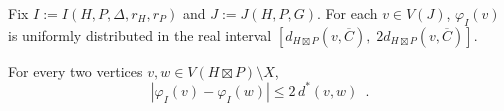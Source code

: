 \documentclass{patmorin}
\renewcommand{\ge}{\geqslant}
\renewcommand{\le}{\leqslant}
\begin{document}


\begin{obs}\label{uniform}
  Fix $I:=I(H,P,\Delta,r_H,r_P)$ and $J:=J(H,P,G)$.  For each $v\in V(J)$,
  $\varphi_I(v)$ is uniformly distributed in the real interval $[d_{H\boxtimes P}(v,\overline{C}),\;2d_{H\boxtimes P}(v,\overline{C})]$.
\end{obs}




\begin{clm}\label{double_distance}
  For every two vertices $v,w\in V(H\boxtimes P)\setminus X$,
  \[
    |\varphi_I(v)-\varphi_I(w)| \le 2\, d^*(v,w) \enspace .
  \]
\end{clm}
\end{document}
